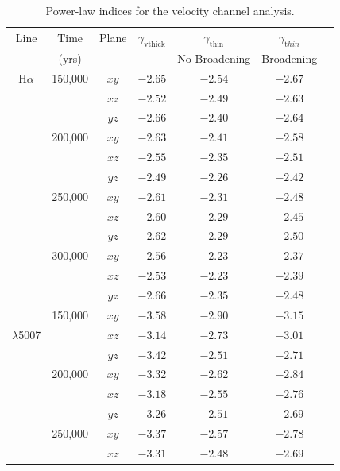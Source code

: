 \documentclass[useAMS,usenatbib]{mn2e}
\begin{document}
\begin{table}
\centering
\caption{Power-law indices for the velocity channel analysis.}
\label{tab:vca}
\begin{tabular}{ccccccc}
\hline
Line & Time & Plane & $\gamma_{\mathrm{vthick}}$ & $\gamma_{\mathrm{thin}}$&  $\gamma_{\mathrm thin}$\\
& (yrs) &  & & No Broadening & Broadening \\
\hline
H$\alpha$ & 150,000  &$xy$& $-2.65$ & $-2.54$ & $-2.67$ \\
                  &                &$xz$& $-2.52$ & $-2.49$ & $-2.63$ \\
                  &                &$yz$& $-2.66$ & $-2.40$ & $-2.64$ \\
                  & 200,000  &$xy$& $-2.63$ & $-2.41$ & $-2.58$\\
                  &                &$xz$& $-2.55$ & $-2.35$ & $-2.51$ \\
                  &                &$yz$& $-2.49$ & $-2.26$ &  $-2.42$ \\
                  & 250,000  &$xy$& $-2.61$ & $-2.31$ & $-2.48$\\
                  &                &$xz$& $-2.60$ & $-2.29$ & $-2.45$ \\
                  &                &$yz$& $-2.62$ & $-2.29$ & $-2.50$ \\
                  & 300,000  &$xy$& $-2.56$ & $-2.23$ & $-2.37$\\
                  &                &$xz$& $-2.53$ & $-2.23$ & $-2.39$ \\
                  &                &$yz$& $-2.66$ & $-2.35$ & $-2.48$ \\
\hline
\oiii{}          & 150,000   &$xy$& $-3.58$ & $-2.90$ &  $-3.15$ \\
$\lambda$5007 &        &$xz$& $-3.14$ & $-2.73$ &  $-3.01$ \\
                  &                &$yz$& $-3.42$ & $-2.51$ &  $-2.71$ \\
                  & 200,000  &$xy$& $-3.32$ & $-2.62$ & $-2.84$ \\
                  &                &$xz$& $-3.18$ & $-2.55$ & $-2.76$ \\
                  &                &$yz$& $-3.26$ & $-2.51$ & $-2.69$ \\
                  & 250,000  &$xy$& $-3.37$ & $-2.57$ & $-2.78$ \\
                  &                &$xz$& $-3.31$ & $-2.48$ & $-2.69$ \\

\end{tabular}
\end{table}
\end{document}
